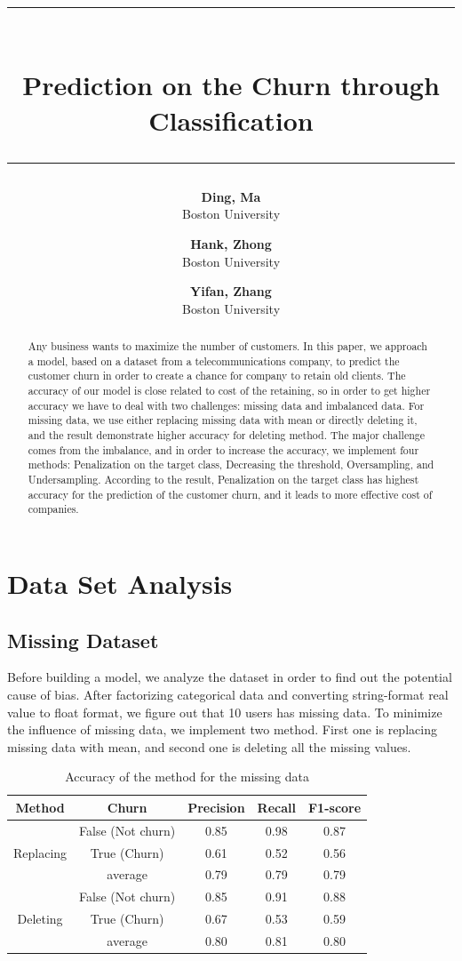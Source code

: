 \documentclass{article}
\author{
  \textbf{Ding, Ma}\\
  Boston University
  \and
  \textbf{Hank, Zhong}\\  
  Boston University
  \and
 \textbf{Yifan, Zhang}\\ 
 Boston University
}
\title{\rule{\textwidth}{4pt}\\\textbf{Prediction on the Churn through Classification}\\\rule{\textwidth}{1pt}}
\begin{document}
\maketitle
\begin{abstract}
  Any business wants to maximize the number of customers. In this paper, we approach a model, based on a dataset from a telecommunications company, to predict the customer churn in order to create a chance for company to retain old clients. The accuracy of our model is close related to cost of the retaining, so in order to get higher accuracy we have to deal with two challenges: missing data and imbalanced data. For missing data, we use either replacing missing data with mean or directly deleting it, and the result demonstrate higher accuracy for deleting method. The major challenge comes from the imbalance, and in order to increase the accuracy, we implement four methods: Penalization on the target class, Decreasing the threshold, Oversampling, and Undersampling. According to the result, Penalization on the target class has highest accuracy for the prediction of the customer churn, and it leads to more effective cost of companies.
\end{abstract}
\section{Data Set Analysis}
\subsection{Missing Dataset}	
Before building a model, we analyze the dataset in order to find out the potential cause of bias. After factorizing categorical data and converting string-format real value to float format, we figure out that 10 users has missing data. To minimize the influence of missing data, we implement two method. First one is replacing missing data with mean, and second one is deleting all the missing values. 
\FloatBarrier
\begin{table}[htb]
\centering
\caption{Accuracy of the method for the missing data}
	\begin{tabular}{||c c c c c||} 
	 \hline
 	Method & Churn & Precision & Recall & F1-score  \\ [0.5ex] 
 	\hline\hline
   	& False (Not churn) & 0.85 & 0.98 & 0.87 \\ 
  	Replacing & True (Churn) & 0.61 & 0.52 & 0.56 \\
   	& average & 0.79 & 0.79 & 0.79 \\
   	\hline
  	& False (Not churn) & 0.85 & 0.91 & 0.88 \\
 	Deleting & True (Churn) & 0.67 & 0.53 & 0.59 \\
  	& average & 0.80 & 0.81 & 0.80 \\ [1ex] 
 	\hline
	\end{tabular}
\label{missing}
\end{table}
\FloatBarrier
\end{document}
